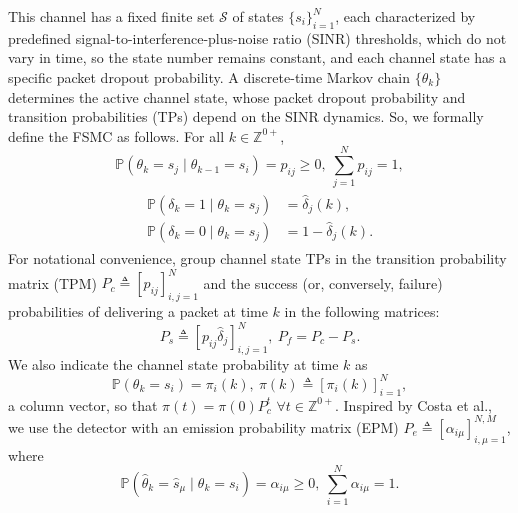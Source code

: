 \documentclass[journal,twoside,web]{ieeecolor}
\begin{document}
This channel has a fixed finite set $\mathcal{S}$ of states $\{s_i\}_{i=1}^{N}$, each characterized by predefined signal-to-interference-plus-noise ratio (SINR) thresholds, which do not vary in time, so the state number remains constant, and each channel state has a specific packet dropout probability. 
A discrete-time Markov chain $\{\theta_k\}$ determines the active channel state, whose packet dropout probability and transition probabilities (TPs) depend on the SINR dynamics. So, we formally define the FSMC as follows.
For all $k\in \mathbb{Z}^{0+}$,
\begin{equation}\label{eq:p-ij}
    \mathbb{P}(\theta_{k} = s_j \mid \theta_{k-1} = s_i) = p_{ij} \geq 0,~ \sum_{j=1}^N p_{ij} = 1,
\end{equation}
\begin{align}\label{eq:p-delta}
\begin{aligned}
    \mathbb{P}(\delta_k = 1 \mid \theta_{k} = s_j) &= \hat{\delta}_{j}(k),\\
    \mathbb{P}(\delta_k = 0 \mid \theta_{k} = s_j) &= 1 - \hat{\delta}_{j}(k).    
\end{aligned}
\end{align}
For notational convenience, group %
channel state TPs in the transition probability matrix (TPM) $P_{c}^{} \triangleq \left[p_{ij}\right]_{i,j=1}^{N}$
and the  success (or, conversely, failure) probabilities of delivering a packet at time $k$ in the following matrices:
\begin{equation}\label{eq:Ps}
    P_{s}^{} \triangleq \left[p_{ij}\hat{\delta}_{j}\right]_{i,j=1}^{N},~P_{f} = P_{c} - P_{s}.
\end{equation}
We also indicate the channel state probability at time $k$ as
\begin{equation}\label{eq:pik}
     \mathbb{P}(\theta_{k} = s_i) = \pi_{i}(k),~\pi(k)\triangleq\left[\pi_{i}(k)\right]_{i=1}^{N},
\end{equation}
a column vector, so that $\pi(t)=\pi(0)P_c^t$ $\forall t\in\mathbb{Z}^{0+}$.
Inspired by Costa et al., we use the detector with an emission probability matrix (EPM) $P_{e}^{} \triangleq \left[\alpha_{i\mu}\right]_{i,\mu=1}^{N,M}$, where
\begin{equation}\label{eq:alpha}
   \mathbb{P}(\hat{\theta}_{k} = \hat{s}_{\mu} \mid \theta_{k} = s_i) = \alpha_{i\mu} \geq 0,~ \sum_{i=1}^N \alpha_{i\mu}= 1.
\end{equation}
\end{document}

